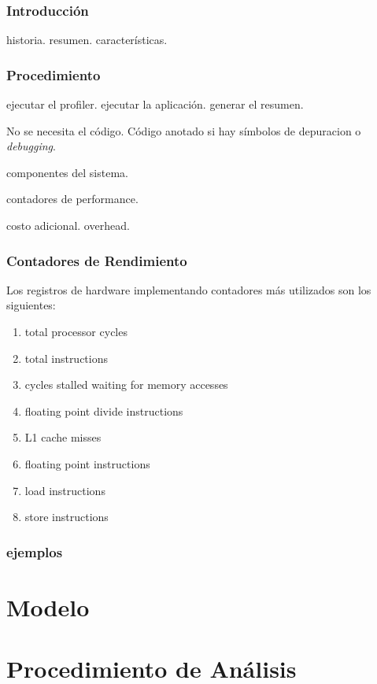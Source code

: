 \documentclass[a4paper]{report}
\begin{document}
\subsection{Introducci\'on}

historia. resumen. caracter\'isticas. 

\subsection{Procedimiento}

ejecutar el profiler. ejecutar la aplicaci\'on. generar el resumen.

No se necesita el c\'odigo. C\'odigo anotado si hay s\'imbolos de depuracion o
{\it debugging}.

componentes del sistema.

contadores de performance.

costo adicional. overhead.

\subsection{Contadores de Rendimiento}

Los registros de hardware implementando contadores m\'as utilizados son los
siguientes:

\begin{enumerate}
\item total processor cycles
\item total instructions
\item cycles stalled waiting for memory accesses
\item floating point divide instructions
\item L1 cache misses
\item floating point instructions
\item load instructions
\item store instructions
\end{enumerate}

\subsection{ejemplos}

\chapter{Modelo}

\chapter{Procedimiento de An\'alisis}
\end{document}

